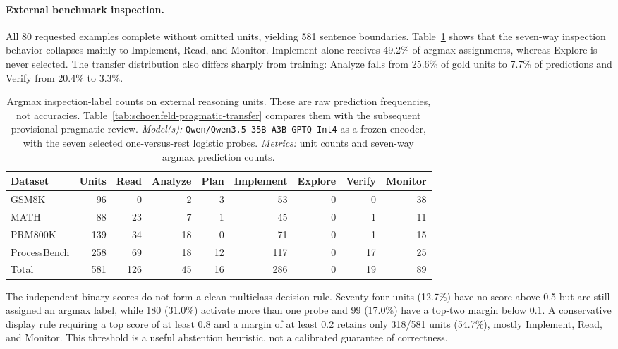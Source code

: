 \documentclass[manuscript,screen,review]{jair}
\newcommand{\modelmetrics}[2]{\textit{Model(s):} #1. \textit{Metrics:} #2.}
\begin{document}
\paragraph{External benchmark inspection.}
All 80 requested examples complete without omitted units, yielding 581
sentence boundaries.  Table~\ref{tab:schoenfeld-external-labels} shows that
the seven-way inspection behavior collapses mainly to Implement, Read, and
Monitor.  Implement alone receives 49.2\% of argmax assignments, whereas
Explore is never selected.  The transfer distribution also differs sharply
from training: Analyze falls from 25.6\% of gold units to 7.7\% of predictions
and Verify from 20.4\% to 3.3\%.

\begin{table}[t]
\centering
\caption{Argmax inspection-label counts on external reasoning units.  These
are raw prediction frequencies, not accuracies.  Table~\ref{tab:schoenfeld-pragmatic-transfer}
compares them with the subsequent provisional pragmatic review.
\modelmetrics{\texttt{Qwen/Qwen3.5-35B-A3B-GPTQ-Int4} as a frozen encoder,
with the seven selected one-versus-rest logistic probes}{unit counts and
seven-way argmax prediction counts}}
\label{tab:schoenfeld-external-labels}
\begin{tabular}{lrrrrrrrr}
\toprule
Dataset & Units & Read & Analyze & Plan & Implement & Explore & Verify & Monitor \\
\midrule
GSM8K        &  96 &   0 &  2 &  3 &  53 & 0 &  0 & 38 \\
MATH         &  88 &  23 &  7 &  1 &  45 & 0 &  1 & 11 \\
PRM800K      & 139 &  34 & 18 &  0 &  71 & 0 &  1 & 15 \\
ProcessBench & 258 &  69 & 18 & 12 & 117 & 0 & 17 & 25 \\
\midrule
Total        & 581 & 126 & 45 & 16 & 286 & 0 & 19 & 89 \\
\bottomrule
\end{tabular}
\end{table}

The independent binary scores do not form a clean multiclass decision rule.
Seventy-four units (12.7\%) have no score above 0.5 but are still assigned an
argmax label, while 180 (31.0\%) activate more than one probe and 99 (17.0\%)
have a top-two margin below 0.1.  A conservative display rule requiring a top
score of at least 0.8 and a margin of at least 0.2 retains only 318/581 units
(54.7\%), mostly Implement, Read, and Monitor.  This threshold is a useful
abstention heuristic, not a calibrated guarantee of correctness.
\end{document}

